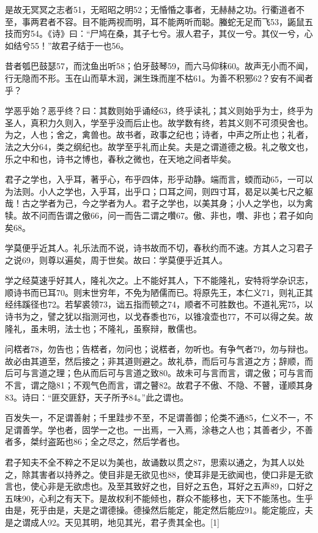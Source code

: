 \documentclass[letterpaper,12pt,english]{sphinxmanual}
\begin{document}
是故无冥冥之志者51，无昭昭之明52；无惛惛之事者，无赫赫之功。行衢道者不至，事两君者不容。目不能两视而明，耳不能两听而聪。螣蛇无足而飞53，鼫鼠五技而穷54。《诗》曰：“尸鸠在桑，其子七兮。淑人君子，其仪一兮。其仪一兮，心如结兮55！”故君子结于一也56。

昔者瓠巴鼓瑟57，而沈鱼出听58；伯牙鼓琴59，而六马仰秣60。故声无小而不闻，行无隐而不形。玉在山而草木润，渊生珠而崖不枯61。为善不积邪62？安有不闻者乎？

学恶乎始？恶乎终？曰：其数则始乎诵经63，终乎读礼；其义则始乎为士，终乎为圣人，真积力久则入，学至乎没而后止也。故学数有终，若其义则不可须臾舍也。为之，人也；舍之，禽兽也。故书者，政事之纪也；诗者，中声之所止也；礼者，法之大分64，类之纲纪也。故学至乎礼而止矣。夫是之谓道德之极。礼之敬文也，乐之中和也，诗书之博也，春秋之微也，在天地之间者毕矣。

君子之学也，入乎耳，著乎心，布乎四体，形乎动静。端而言，蝡而动65，一可以为法则。小人之学也，入乎耳，出乎口；口耳之间，则四寸耳，曷足以美七尺之躯哉！古之学者为己，今之学者为人。君子之学也，以美其身；小人之学也，以为禽犊。故不问而告谓之傲66，问一而告二谓之囋67。傲、非也，囋、非也；君子如向矣68。

学莫便乎近其人。礼乐法而不说，诗书故而不切，春秋约而不速。方其人之习君子之说69，则尊以遍矣，周于世矣。故曰：学莫便乎近其人。

学之经莫速乎好其人，隆礼次之。上不能好其人，下不能隆礼，安特将学杂识志，顺诗书而已耳70。则末世穷年，不免为陋儒而已。将原先王，本仁义71，则礼正其经纬蹊径也72。若挈裘领73，诎五指而顿之74，顺者不可胜数也。不道礼宪75，以诗书为之，譬之犹以指测河也，以戈舂黍也76，以锥飡壶也77，不可以得之矣。故隆礼，虽未明，法士也；不隆礼，虽察辩，散儒也。

问楛者78，勿告也；告楛者，勿问也；说楛者，勿听也。有争气者79，勿与辩也。故必由其道至，然后接之；非其道则避之。故礼恭，而后可与言道之方；辞顺，而后可与言道之理；色从而后可与言道之致80。故未可与言而言，谓之傲；可与言而不言，谓之隐81；不观气色而言，谓之瞽82。故君子不傲、不隐、不瞽，谨顺其身83。诗曰：“匪交匪舒，天子所予84。”此之谓也。

百发失一，不足谓善射；千里跬步不至，不足谓善御；伦类不通85，仁义不一，不足谓善学。学也者，固学一之也。一出焉，一入焉，涂巷之人也；其善者少，不善者多，桀纣盗跖也86；全之尽之，然后学者也。

君子知夫不全不粹之不足以为美也，故诵数以贯之87，思索以通之，为其人以处之，除其害者以持养之。使目非是无欲见也88，使耳非是无欲闻也，使口非是无欲言也，使心非是无欲虑也。及至其致好之也，目好之五色，耳好之五声89，口好之五味90，心利之有天下。是故权利不能倾也，群众不能移也，天下不能荡也。生乎由是，死乎由是，夫是之谓德操。德操然后能定，能定然后能应91。能定能应，夫是之谓成人92。天见其明，地见其光，君子贵其全也。{[}1{]}
\end{document}
